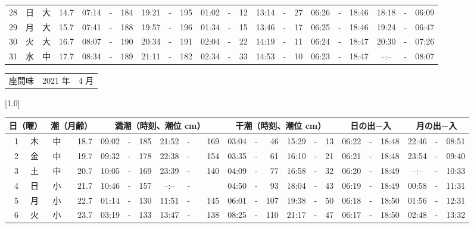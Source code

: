 \documentclass[12pt,a4j]{jsarticle}
\begin{document}
\begin{table}[htbp]
\begin{center}
{\begin{tabular}{|rc|cr|ccrccr|ccrccr|ccc|ccc|}
28 & 日 & 大 & 14.7 &  07:14 &-& 184 &  19:21 &-& 195 &  01:02 &-&  12 &  13:14 &-&  27 & 06:26 & -& 18:46 & 18:18 & -& 06:09 \\
29 & 月 & 大 & 15.7 &  07:41 &-& 188 &  19:57 &-& 196 &  01:34 &-&  15 &  13:46 &-&  17 & 06:25 & -& 18:46 & 19:24 & -& 06:47 \\
30 & 火 & 大 & 16.7 &  08:07 &-& 190 &  20:34 &-& 191 &  02:04 &-&  22 &  14:19 &-&  11 & 06:24 & -& 18:47 & 20:30 & -& 07:26 \\
31 & 水 & 中 & 17.7 &  08:34 &-& 189 &  21:11 &-& 182 &  02:34 &-&  33 &  14:53 &-&  10 & 06:23 & -& 18:47 & --:-- & -& 08:07 \\
   \hline
   \end{tabular}}
   \end{center}
\end{table}
\newpage
 \begin{table}[htbp]
 \begin{center}
 \begin{tabular}{lcc}
 \LARGE{座間味}  & \large{2021 年} & \large{ 4 月} \\
 \end{tabular}
 \end{center}
 \begin{center}
    \scalebox{0.7}[1.0]{
    \begin{tabular}{|rc|cr|ccrccr|ccrccr|ccc|ccc|}
    \hline
    \multicolumn{2}{|c|}{日（曜）} & \multicolumn{2}{c|}{潮（月齢）} & \multicolumn{6}{c|}{満潮（時刻、潮位 cm）} & \multicolumn{6}{c|}{干潮（時刻、潮位 cm）} & \multicolumn{3}{c|}{日の出−入} &  \multicolumn{3}{c|}{月の出−入}\\
 \hline
 1 & 木 & 中 & 18.7 &  09:02 &-& 185 &  21:52 &-& 169 &  03:04 &-&  46 &  15:29 &-&  13 & 06:22 & -& 18:48 & 22:46 & -& 08:51 \\
 2 & 金 & 中 & 19.7 &  09:32 &-& 178 &  22:38 &-& 154 &  03:35 &-&  61 &  16:10 &-&  21 & 06:21 & -& 18:48 & 23:54 & -& 09:40 \\
 3 & 土 & 中 & 20.7 &  10:05 &-& 169 &  23:39 &-& 140 &  04:09 &-&  77 &  16:58 &-&  32 & 06:20 & -& 18:49 & --:-- & -& 10:33 \\
 4 & 日 & 小 & 21.7 &  10:46 &-& 157 &  --:-- &-&~~~~~ &  04:50 &-&  93 &  18:04 &-&  43 & 06:19 & -& 18:49 & 00:58 & -& 11:31 \\
 5 & 月 & 小 & 22.7 &  01:14 &-& 130 &  11:51 &-& 145 &  06:01 &-& 107 &  19:38 &-&  50 & 06:18 & -& 18:50 & 01:56 & -& 12:31 \\
 6 & 火 & 小 & 23.7 &  03:19 &-& 133 &  13:47 &-& 138 &  08:25 &-& 110 &  21:17 &-&  47 & 06:17 & -& 18:50 & 02:48 & -& 13:32 \\

\end{tabular}}
\end{center}
\end{table}
\end{document}
